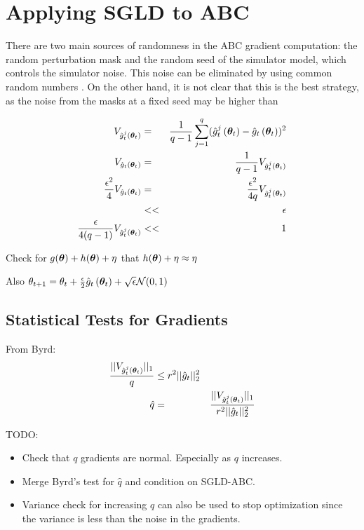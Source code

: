 \documentclass[]{article}
\begin{document}
\section{Applying SGLD to ABC}

There are two main sources of randomness in the ABC gradient computation: the random perturbation mask and the random seed of the simulator model, which controls the simulator noise.  This noise can be eliminated by using common random numbers \cite{spall-crn}.  On the other hand, it is not clear that this is the best strategy, as the noise from the masks at a fixed seed may be higher than   

\begin{eqnarray}
  V_{\gradestimaterepeat{t}{\thetav_t}{j}} & = & \frac{1}{q-1} \sum_{j=1}^q (\gradestimaterepeat{t}{\thetav_t}{j} - \gradestimate{t}{\thetav_t})^2 \\
  V_{\gradestimate{t}{\thetav_t}} & = & \frac{1}{q-1} V_{\gradestimaterepeat{t}{\thetav_t}{j}} \\
  \frac{\epsilon^2}{4 }V_{\gradestimate{t}{\thetav_t}} & = & \frac{\epsilon^2}{4 q }V_{\gradestimaterepeat{t}{\thetav_t}{j}} \\
                                                       & << & \epsilon \\
                    \frac{\epsilon}{4 (q-1) }V_{\gradestimaterepeat{t}{\thetav_t}{j}}  & << & 1                                  
\end{eqnarray}

Check for $g(\thetav) + h(\thetav) + \eta$ that $h(\thetav) + \eta \approx \eta$

Also $\theta_{t+1} = \theta_t + \frac{\epsilon}{2}\gradestimate{t}{\thetav_t} + \sqrt{\epsilon}\mathcal{N}(0,1)$

\subsection{Statistical Tests for Gradients}

From Byrd:
\begin{eqnarray}
\frac{||V_{\gradestimaterepeat{t}{\thetav_t}{j}} ||_1}{q} & \leq r^2 || \hat{g}_t ||_2^2 \\
\hat{q} & = & \frac{||V_{\gradestimaterepeat{t}{\thetav_t}{j}} ||_1}{r^2 || \hat{g}_t ||_2^2}
\end{eqnarray}

TODO:
\begin{itemize}
  \item Check that $q$ gradients are normal.  Especially as $q$ increases.
  \item Merge Byrd's test for $\hat{q}$ and condition on SGLD-ABC.
  \item Variance check for increasing $q$ can also be used to stop optimization since the variance is less than the noise in the gradients.
\end{itemize}
\end{document}
